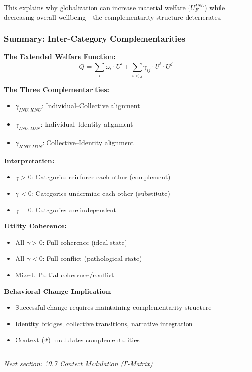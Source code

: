 This explains why globalization can increase material welfare ($U^{INU}_F$) 
while decreasing overall wellbeing---the complementarity structure deteriorates.

\subsubsection{Summary: Inter-Category Complementarities}

\begin{tcolorbox}[colback=gray!5!white, colframe=gray!75!black, title=Section 10.6 Summary]
\textbf{The Extended Welfare Function:}
$$Q = \sum_{i} \omega_i \cdot U^i + \sum_{i < j} \gamma_{ij} \cdot U^i \cdot U^j$$

\textbf{The Three Complementarities:}
\begin{itemize}
\item $\gamma_{INU,KNU}$: Individual--Collective alignment
\item $\gamma_{INU,IDN}$: Individual--Identity alignment
\item $\gamma_{KNU,IDN}$: Collective--Identity alignment
\end{itemize}

\textbf{Interpretation:}
\begin{itemize}
\item $\gamma > 0$: Categories reinforce each other (complement)
\item $\gamma < 0$: Categories undermine each other (substitute)
\item $\gamma = 0$: Categories are independent
\end{itemize}

\textbf{Utility Coherence:}
\begin{itemize}
\item All $\gamma > 0$: Full coherence (ideal state)
\item All $\gamma < 0$: Full conflict (pathological state)
\item Mixed: Partial coherence/conflict
\end{itemize}

\textbf{Behavioral Change Implication:}
\begin{itemize}
\item Successful change requires maintaining complementarity structure
\item Identity bridges, collective transitions, narrative integration
\item Context ($\Psi$) modulates complementarities
\end{itemize}
\end{tcolorbox}

\vspace{1em}
\hrule
\vspace{0.5em}
\noindent\textit{Next section: 10.7 Context Modulation ($\Gamma$-Matrix)}

